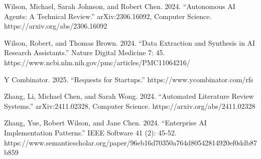 \documentclass[
]{article}
\begin{document}
Wilson, Michael, Sarah Johnson, and Robert Chen. 2024. ``Autonomous AI
Agents: A Technical Review.'' arXiv:2306.16092, Computer Science.
https://arxiv.org/abs/2306.16092

Wilson, Robert, and Thomas Brown. 2024. ``Data Extraction and Synthesis
in AI Research Assistants.'' Nature Digital Medicine 7: 45.
https://www.ncbi.nlm.nih.gov/pmc/articles/PMC11064216/

Y Combinator. 2025. ``Requests for Startups.''
https://www.ycombinator.com/rfs

Zhang, Li, Michael Chen, and Sarah Wong. 2024. ``Automated Literature
Review Systems.'' arXiv:2411.02328, Computer Science.
https://arxiv.org/abs/2411.02328

Zhang, Yue, Robert Wilson, and Jane Chen. 2024. ``Enterprise AI
Implementation Patterns.'' IEEE Software 41 (2): 45-52.
https://www.semanticscholar.org/paper/96eb16d70350a764d80542814920ef0ddb87b859
\end{document}
